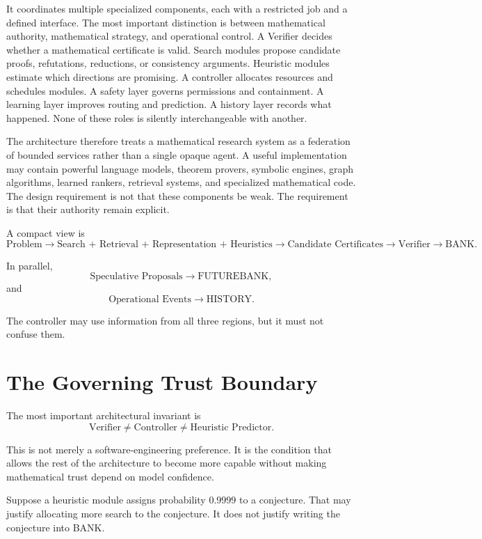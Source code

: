 \documentclass[11pt]{article}
\begin{document}
It coordinates multiple specialized components, each with a restricted job and a defined interface. The most important distinction is between mathematical authority, mathematical strategy, and operational control. A Verifier decides whether a mathematical certificate is valid. Search modules propose candidate proofs, refutations, reductions, or consistency arguments. Heuristic modules estimate which directions are promising. A controller allocates resources and schedules modules. A safety layer governs permissions and containment. A learning layer improves routing and prediction. A history layer records what happened. None of these roles is silently interchangeable with another.

The architecture therefore treats a mathematical research system as a federation of bounded services rather than a single opaque agent. A useful implementation may contain powerful language models, theorem provers, symbolic engines, graph algorithms, learned rankers, retrieval systems, and specialized mathematical code. The design requirement is not that these components be weak. The requirement is that their authority remain explicit.

A compact view is
\[
\text{Problem}
\longrightarrow
\text{Search + Retrieval + Representation + Heuristics}
\longrightarrow
\text{Candidate Certificates}
\longrightarrow
\text{Verifier}
\longrightarrow
\text{BANK}.
\]

In parallel,
\[
\text{Speculative Proposals}
\longrightarrow
\text{FUTUREBANK},
\]
and
\[
\text{Operational Events}
\longrightarrow
\text{HISTORY}.
\]

The controller may use information from all three regions, but it must not confuse them.

\section{The Governing Trust Boundary}

The most important architectural invariant is
\[
\boxed{\text{Verifier} \neq \text{Controller} \neq \text{Heuristic Predictor}.}
\]

This is not merely a software-engineering preference. It is the condition that allows the rest of the architecture to become more capable without making mathematical trust depend on model confidence.

Suppose a heuristic module assigns probability $0.9999$ to a conjecture. That may justify allocating more search to the conjecture. It does not justify writing the conjecture into BANK.
\end{document}

